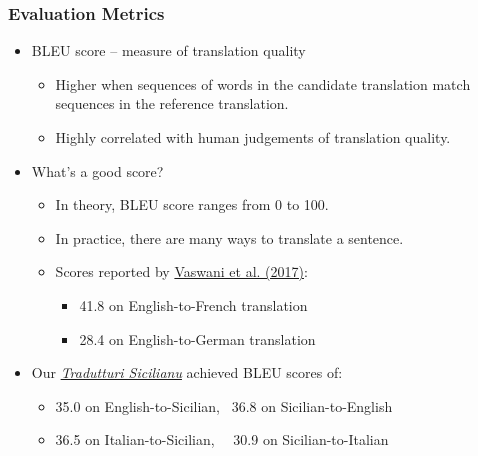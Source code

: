 \documentclass{beamer}
\begin{document}
\begin{frame}
  \frametitle{Evaluation Metrics}
  \vspace{-1.0em}
  \begin{itemize}
  \item BLEU score -- measure of translation quality
    \begin{itemize}
    \item Higher when sequences of words in the candidate translation match sequences in the reference translation.
    \item Highly correlated with human judgements of translation quality.
    \end{itemize} 
    \vspace{0.5em}
  \item What's a good score?
    \begin{itemize}
    \item In theory, BLEU score ranges from 0 to 100.
    \item In practice, there are many ways to translate a sentence.
    \item Scores reported by \href{https://arxiv.org/abs/1706.03762}{Vaswani et al. (2017)}:
      \begin{itemize} 
      \item 41.8 on English-to-French translation
      \item 28.4 on English-to-German translation
      \end{itemize} 
    \end{itemize} 
    \vspace{0.5em}
  \item Our \href{https://translate.napizia.com}{\textit{Tradutturi Sicilianu}} achieved BLEU scores of:
    \begin{itemize}
    \item 35.0 on English-to-Sicilian,~  36.8 on Sicilian-to-English
    \item 36.5 on Italian-to-Sicilian,~~ 30.9 on Sicilian-to-Italian
    \end{itemize} 
  \end{itemize} 
\end{frame}

\end{document}
